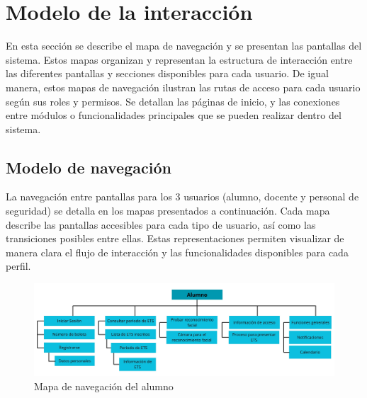 \section{Modelo de la interacción}	
\label{cap:modInteraccion}

En esta sección se describe el mapa de navegación y se presentan las pantallas del sistema. Estos mapas organizan y representan la estructura de interacción entre las diferentes pantallas y secciones disponibles para cada usuario. 
De igual manera, estos mapas de navegación ilustran las rutas de acceso para cada usuario según sus roles y permisos. Se detallan las páginas de inicio, y las conexiones entre módulos o funcionalidades principales que se pueden realizar dentro del sistema.

\subsection{Modelo de navegación}

La navegación entre pantallas para los 3 usuarios (alumno, docente y personal de seguridad) se detalla en los mapas presentados a continuación. Cada mapa describe las pantallas accesibles para cada tipo de usuario, así como las transiciones posibles entre ellas. Estas representaciones permiten visualizar de manera clara el flujo de interacción y las funcionalidades disponibles para cada perfil.

\begin{figure}[htbp]
	\begin{center}
			\includegraphics[width=1.0\textwidth]{images/alumno}
			\caption{Mapa de navegación del alumno}
			\label{fig:Mapa de navegación del alumno}
		\end{center}
\end{figure}

\clearpage

